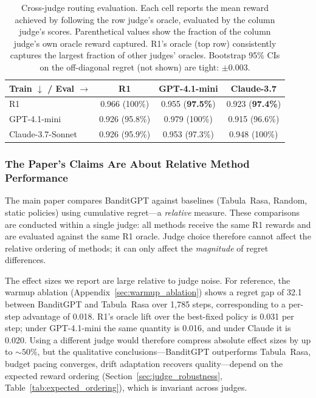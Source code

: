 \begin{table}[h]
\centering
\caption{Cross-judge routing evaluation.  Each cell reports the mean
reward achieved by following the row judge's oracle, evaluated by the
column judge's scores.  Parenthetical values show the fraction of the
column judge's own oracle reward captured. R1's oracle (top row)
consistently captures the largest fraction of other judges' oracles.
Bootstrap 95\% CIs on the off-diagonal regret (not shown) are tight:
$\pm 0.003$.}
\label{tab:cross_regret}
\small
\begin{tabular}{lccc}
\toprule
\textbf{Train $\downarrow$ / Eval $\rightarrow$}
    & \textbf{R1} & \textbf{GPT-4.1-mini} & \textbf{Claude-3.7} \\
\midrule
R1
    & 0.966 (100\%) & 0.955 (\textbf{97.5\%}) & 0.923 (\textbf{97.4\%}) \\
GPT-4.1-mini
    & 0.926 (95.8\%) & 0.979 (100\%) & 0.915 (96.6\%) \\
Claude-3.7-Sonnet
    & 0.926 (95.9\%) & 0.953 (97.3\%) & 0.948 (100\%) \\
\bottomrule
\end{tabular}
\end{table}

\subsubsection{The Paper's Claims Are About Relative Method Performance}

The main paper compares BanditGPT against baselines (Tabula~Rasa, Random,
static policies) using cumulative regret---a \emph{relative} measure.
These comparisons are conducted within a single judge: all methods receive
the same R1 rewards and are evaluated against the same R1 oracle.  Judge
choice therefore cannot affect the relative ordering of methods; it can
only affect the \emph{magnitude} of regret differences.

The effect sizes we report are large relative to judge noise.
For reference, the warmup ablation (Appendix~\ref{sec:warmup_ablation})
shows a regret gap of 32.1 between BanditGPT and Tabula~Rasa over
1{,}785 steps, corresponding to a per-step advantage of 0.018.
R1's oracle lift over the best-fixed policy is 0.031 per step; under
GPT-4.1-mini the same quantity is 0.016, and under Claude it is 0.020.
Using a different judge would therefore compress absolute effect sizes
by up to ${\sim}50\%$, but the qualitative conclusions---BanditGPT
outperforms Tabula~Rasa, budget pacing converges, drift adaptation
recovers quality---depend on the expected reward ordering
(Section~\ref{sec:judge_robustness}, Table~\ref{tab:expected_ordering}),
which is invariant across judges.


